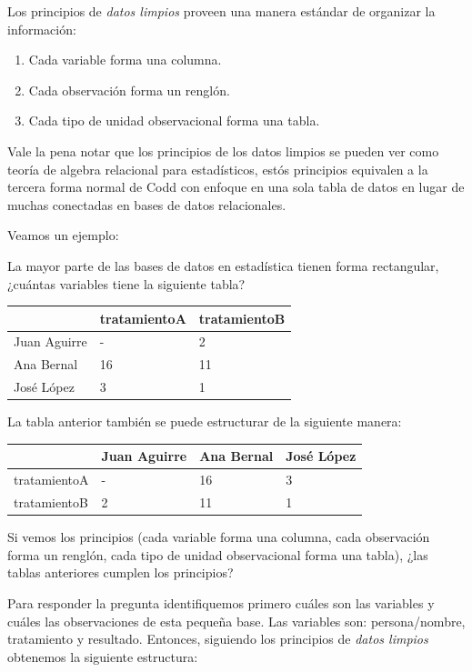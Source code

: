 \documentclass[
]{book}
\providecommand{\tightlist}{%
  \setlength{\itemsep}{0pt}\setlength{\parskip}{0pt}}
\begin{document}
Los principios de \emph{datos limpios} \citep{tidy}
proveen una manera estándar de organizar la información:

\begin{enumerate}
\def\labelenumi{\arabic{enumi}.}
\tightlist
\item
  Cada variable forma una columna.
\item
  Cada observación forma un renglón.
\item
  Cada tipo de unidad observacional forma una tabla.
\end{enumerate}

Vale la pena notar que los principios de los datos limpios se pueden ver como
teoría de algebra relacional para estadísticos, estós principios equivalen a
la tercera forma normal de Codd con enfoque en una sola tabla de datos en
lugar de muchas conectadas en bases de datos relacionales.

Veamos un ejemplo:

La mayor parte de las bases de datos en estadística tienen forma rectangular,
¿cuántas variables tiene la siguiente tabla?

\begin{longtable}[]{@{}lll@{}}
\toprule()
& tratamientoA & tratamientoB \\
\midrule()
\endhead
Juan Aguirre & - & 2 \\
Ana Bernal & 16 & 11 \\
José López & 3 & 1 \\
\bottomrule()
\end{longtable}

La tabla anterior también se puede estructurar de la siguiente manera:

\begin{longtable}[]{@{}llll@{}}
\toprule()
& Juan Aguirre & Ana Bernal & José López \\
\midrule()
\endhead
tratamientoA & - & 16 & 3 \\
tratamientoB & 2 & 11 & 1 \\
\bottomrule()
\end{longtable}

Si vemos los principios (cada variable forma una columna, cada observación
forma un renglón, cada tipo de unidad observacional forma una tabla), ¿las
tablas anteriores cumplen los principios?

Para responder la pregunta identifiquemos primero cuáles son las variables y
cuáles las observaciones de esta pequeña base. Las variables son:
persona/nombre, tratamiento y resultado. Entonces, siguiendo los principios de
\emph{datos limpios} obtenemos la siguiente estructura:
\end{document}

